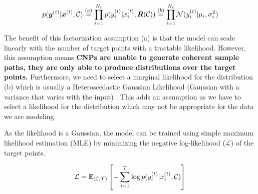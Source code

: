 \documentclass[../../main.tex]{subfiles}
\begin{document}
\begin{align}
    p(\bm{y}^{(t)} | \bm{x}^{(t)}, \mathcal{C}) &\stackrel{(a)}{=} \prod_{i=1}^{N_t} p({y}_i^{(t)} | {x}_i^{(t)}, \bm{R}(\mathcal{C}))  \stackrel{(b)}{=}
    \prod_{i=1}^{N_t} \mathcal{N}({y}_i^{(t)} | \mu_i, \sigma_i^2) \\
\end{align}

The benefit of this factorization assumption (a) is that the model can scale linearly with the number of target points with a tractable likelihood. However, this assumption means
\textbf{CNPs are unable to generate coherent sample paths, they are only able to produce distributions over the target points.} Furthermore, we need to select a marginal likelihood for the distribution (b) which is usually a Heteroscedastic Gaussian Likelihood (Gaussian with a variance that varies with the input) \parencite{garnelo2018conditional}. This adds an assumption as we have to select a likelihood for the distribution which may not be appropriate for the data we are modeling.


As the likelihood is a Gaussian, the model can be trained using simple maximum likelihood estimation (MLE) by minimizing the negative log-likelihood ($\mathcal{L}$) of the target points.

\begin{equation}
    \mathcal{L} = \mathbb{E}_{(\mathcal{C}, \mathcal{T})} \left[- \sum_{i=1}^{|\mathcal{T}|} \log p({y}_i^{(t)} | {x}_i^{(t)}, \mathcal{C})\right]
\end{equation}



\end{document}
